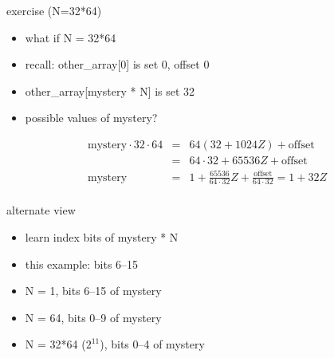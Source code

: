 \begin{frame}{exercise (N=32*64)}
    \begin{itemize}
    \item what if N = 32*64
    \item recall: other\_array[0] is set 0, offset 0
    \item other\_array[mystery * N] is set 32
    \item possible values of mystery?
    \end{itemize}
\vspace{-.5cm}
\[
\begin{align*}
\text{mystery}\cdot 32\cdot 64 & = & 64(32+1024Z) + \text{offset} \\
        & = & 64\cdot32 + 65536Z + \text{offset}\\
\text{mystery} & = & 1 + \frac{65536}{64\cdot32}Z + \frac{\text{offset}}{64\cdot32} = 1+32Z \\
\end{align*}
\]
\end{frame}

\begin{frame}{alternate view}
    \begin{itemize}
    \item learn index bits of mystery * N
    \item this example: bits 6--15
    \vspace{.5cm}
    \item N = 1, bits 6--15 of mystery
    \item N = 64, bits 0--9 of mystery
    \item N = 32*64 ($2^{11}$), bits 0--4 of mystery
    \end{itemize}
\end{frame}
